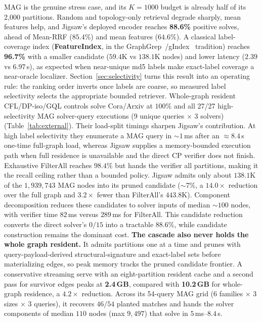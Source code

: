 \documentclass[runningheads]{llncs}
\begin{document}
MAG is the genuine stress case, and its $K{=}1000$ budget is already half of its 2{,}000 partitions. Random and topology-only retrieval degrade sharply, mean features help, and Jigsaw's deployed encoder reaches \textbf{88.6\%} positive solves, ahead of Mean-RRF ($85.4\%$) and mean features ($64.6\%$). A classical label-coverage index (\textbf{FeatureIndex}, in the GraphGrep~\cite{ref_graphgrep}/gIndex~\cite{ref_gindex} tradition) reaches \textbf{96.7\%} with a smaller candidate ($59.4$K vs $138.1$K nodes) and lower latency ($2.39$ vs $6.97$\,s), as expected when near-unique md5 labels make exact-label coverage a near-oracle localizer. Section~\ref{sec:selectivity} turns this result into an operating rule: the ranking order inverts once labels are coarse, so measured label selectivity selects the appropriate bounded retriever. Whole-graph resident CFL/DP-iso/GQL controls solve Cora/Arxiv at $100\%$ and all 27/27 high-selectivity MAG solver-query executions (9 unique queries $\times$ 3 solvers) (Table~\ref{tab:external}). Their load-split timings sharpen Jigsaw's contribution. At high label selectivity they enumerate a MAG query in ${\sim}1$\,ms after an ${\approx}8.4$\,s one-time full-graph load, whereas Jigsaw supplies a memory-bounded execution path when full residence is unavailable and the direct CP verifier does not finish. Exhaustive FilterAll reaches $98.4\%$ but hands the verifier all partitions, making it the recall ceiling rather than a bounded policy. Jigsaw admits only about $138.1$K of the $1{,}939{,}743$ MAG nodes into its pruned candidate ($\sim$7\%, a $14.0\times$ reduction over the full graph and $3.2\times$ fewer than FilterAll's $443.8$K). Component decomposition reduces these candidates to solver inputs of median ${\sim}100$ nodes, with verifier time $82$\,ms versus $289$\,ms for FilterAll. This candidate reduction converts the direct solver's $0/15$ into a tractable $88.6\%$, while candidate construction remains the dominant cost. \textbf{The cascade also never holds the whole graph resident.} It admits partitions one at a time and prunes with query-payload-derived structural-signature and exact-label sets before materializing edges, so peak memory tracks the pruned candidate frontier. A conservative streaming serve with an eight-partition resident cache and a second pass for survivor edges peaks at \textbf{2.4\,GB}, compared with \textbf{10.2\,GB} for whole-graph residence, a $4.2\times$ reduction. Across its 54-query MAG grid (6 families $\times$ 3 sizes $\times$ 3 queries), it recovers $46/54$ planted matches and hands the solver components of median $110$ nodes (max $9{,}497$) that solve in $5$\,ms--$8.4$\,s.
\end{document}
